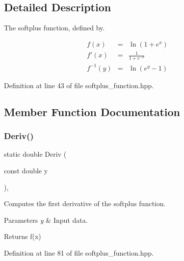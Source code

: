 \subsection{Detailed Description}
The softplus function, defined by. 

\begin{eqnarray*} f(x) &=& \ln(1 + e^{x}) \\ f'(x) &=& \frac{1}{1 + e^{-x}} \\ f^{-1}(y) &=& \ln(e^{y} - 1) \end{eqnarray*} 

Definition at line 43 of file softplus\+\_\+function.\+hpp.



\subsection{Member Function Documentation}
\mbox{\label{classmlpack_1_1ann_1_1SoftplusFunction_a163d34fd09f8edf457164f5033c635cf}} 
\subsubsection{Deriv()\hspace{0.1cm}{\footnotesize\ttfamily [1/2]}}
{\footnotesize\ttfamily static double Deriv (\begin{DoxyParamCaption}\item[{const double}]{y }\end{DoxyParamCaption})\hspace{0.3cm}{\ttfamily [inline]}, {\ttfamily [static]}}



Computes the first derivative of the softplus function. 


\begin{DoxyParams}{Parameters}
{\em y} & Input data. \\
\hline
\end{DoxyParams}
\begin{DoxyReturn}{Returns}
f\textquotesingle{}(x) 
\end{DoxyReturn}


Definition at line 81 of file softplus\+\_\+function.\+hpp.

\mbox{\label{classmlpack_1_1ann_1_1SoftplusFunction_ac7573a8739be4400959956c5cc42d19b}} 
